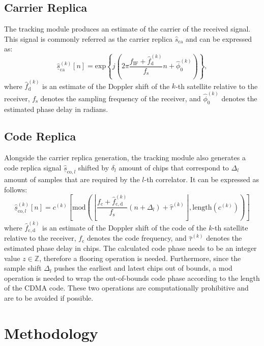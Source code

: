 \documentclass{juliacon}
\begin{document}
\subsection*{Carrier Replica}
The tracking module produces an estimate of the carrier of the received signal. This signal is commonly referred as the carrier replica $\hat{s}_{\mathrm{ca}}$ and can be expressed as:
\begin{equation}\label{eqn:carrier-replica}
    \underline{\hat{s}}_{\mathrm{ca}}^{(k)}[n]= \mathrm{exp}\left\{j\left(2 \pi \frac{f_{\mathrm{IF}} + \hat{f}^{(k)}_{\mathrm{d}}}{f_{\mathrm{s}}} n+\hat{\phi}^{(k)}_{0}\right)\right\},
\end{equation}
where $\hat{f}^{(k)}_{\mathrm{d}}$ is an estimate of the Doppler shift of the $k$-th satellite relative to the receiver, $f_{\mathrm{s}}$ denotes the sampling frequency of the receiver, and $\hat{\phi}^{(k)}_{0}$ denotes the estimated phase delay in radians.

\subsection*{Code Replica}
Alongside the carrier replica generation, the tracking module also generates a code replica signal $\underline{\hat{s}}_{\mathrm{co}, l}$ shifted by $\delta_l$ amount of chips that correspond to $\Delta_l$ amount of samples that are required by the $l$-th correlator. It can be expressed as follows:
\begin{equation}\label{eqn:code-replica}
    \underline{\hat{s}}_{\mathrm{co}, l}^{(k)}[n] = c^{(k)}\left[ \mathrm{mod}\left(\left\lfloor\frac{f_{\mathrm{c}}+\hat{f}^{(k)}_{\mathrm{c}, \mathrm{d}}}{f_{\mathrm{s}}}(n+\Delta_l)+\hat{\tau}^{(k)}\right\rfloor, \mathrm{length}(c^{(k)})\right)  \right]
\end{equation}
where $\hat{f}^{(k)}_{\mathrm{c, d}}$ is an estimate of the Doppler shift of the code of the $k$-th satellite relative to the receiver, $f_{\mathrm{c}}$ denotes the code frequency, and $\hat{\tau}^{(k)}$ denotes the estimated phase delay in chips. The calculated code phase needs to be an integer value $z \in \mathbb{Z}$, therefore a flooring operation is needed. Furthermore, since the sample shift $\Delta_l$ pushes the earliest and latest chips out of bounds, a mod operation is needed to wrap the out-of-bounds code phase according to the length of the CDMA code. These two operations are computationally prohibitive and are to be avoided if possible.

\section{Methodology}\label{sec:methodology}
\end{document}
